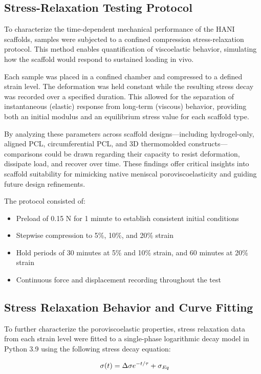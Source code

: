 \subsection{Stress-Relaxation Testing Protocol}

To characterize the time-dependent mechanical performance of the HANI scaffolds, samples were subjected to a confined compression stress-relaxation protocol. This method enables quantification of viscoelastic behavior, simulating how the scaffold would respond to sustained loading in vivo. 

Each sample was placed in a confined chamber and compressed to a defined strain level. The deformation was held constant while the resulting stress decay was recorded over a specified duration. This allowed for the separation of instantaneous (elastic) response from long-term (viscous) behavior, providing both an initial modulus and an equilibrium stress value for each scaffold type.

By analyzing these parameters across scaffold designs—including hydrogel-only, aligned PCL, circumferential PCL, and 3D thermomolded constructs—comparisons could be drawn regarding their capacity to resist deformation, dissipate load, and recover over time. These findings offer critical insights into scaffold suitability for mimicking native meniscal poroviscoelasticity and guiding future design refinements.

The protocol consisted of:
\begin{itemize}
    \item Preload of 0.15 N for 1 minute to establish consistent initial conditions
    \item Stepwise compression to 5\%, 10\%, and 20\% strain
    \item Hold periods of 30 minutes at 5\% and 10\% strain, and 60 minutes at 20\% strain
    \item Continuous force and displacement recording throughout the test
\end{itemize}

\subsection{Stress Relaxation Behavior and Curve Fitting}
To further characterize the poroviscoelastic properties, stress relaxation data from each strain level were fitted to a single-phase logarithmic decay model in Python 3.9 using the following stress decay equation:

\begin{equation}
\textit{} \,\ \sigma(t) = \Delta \sigma e^{-t / \tau} + \sigma_{\text{\textit{Eq}}}
\end{equation}

